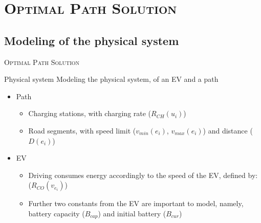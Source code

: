 \section{\scshape Optimal Path Solution}
\subsection{Modeling of the physical system}

\begin{frame}
\center \huge \scshape Optimal Path Solution
\end{frame}

\begin{frame}{Physical system}
Modeling the physical system, of an EV and a path
\begin{figure}[!htb]
\centering
\end{figure} 
\begin{itemize}
\item Path
\begin{itemize}
\item Charging stations, with charging rate ($R_{CH}(u_i)$)
\item Road segments, with speed limit ($v_{min}(e_i)$, $v_{max}(e_i)$) and distance ($D(e_i)$) 
\end{itemize}
\item EV
\begin{itemize}
\item Driving consumes energy accordingly to the speed of the EV, defined by: ($R_{CO}(v_{e_i})$)
\item Further two constants from the EV are important to model, namely, battery capacity ($B_{cap}$) and initial battery ($B_{cur}$)
\end{itemize}
\end{itemize} 
\end{frame}
